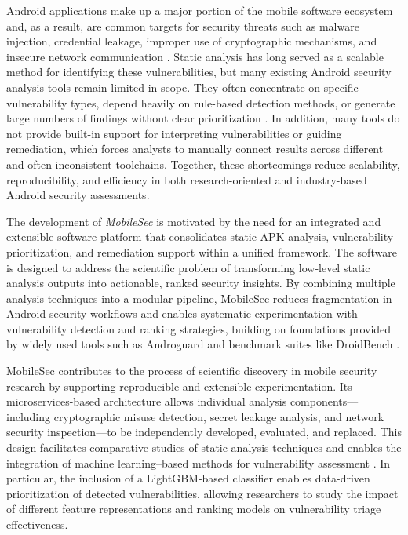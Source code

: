 \documentclass[preprint,12pt, a4paper]{elsarticle}
\begin{document}
Android applications make up a major portion of the mobile software ecosystem and, as a result, are common targets for security threats such as malware injection, credential leakage, improper use of cryptographic mechanisms, and insecure network communication \cite{arzt2014flowdroid, enck2014taintdroid}. Static analysis has long served as a scalable method for identifying these vulnerabilities, but many existing Android security analysis tools remain limited in scope. They often concentrate on specific vulnerability types, depend heavily on rule-based detection methods, or generate large numbers of findings without clear prioritization \cite{feng2014apposcopy, li2017iccta}. In addition, many tools do not provide built-in support for interpreting vulnerabilities or guiding remediation, which forces analysts to manually connect results across different and often inconsistent toolchains. Together, these shortcomings reduce scalability, reproducibility, and efficiency in both research-oriented and industry-based Android security assessments.

The development of \textit{MobileSec} is motivated by the need for an integrated and extensible software platform that consolidates static APK analysis, vulnerability prioritization, and remediation support within a unified framework. The software is designed to address the scientific problem of transforming low-level static analysis outputs into actionable, ranked security insights. By combining multiple analysis techniques into a modular pipeline, MobileSec reduces fragmentation in Android security workflows and enables systematic experimentation with vulnerability detection and ranking strategies, building on foundations provided by widely used tools such as Androguard \cite{desnos2011androguard} and benchmark suites like DroidBench \cite{arzt2014droidbench}.

MobileSec contributes to the process of scientific discovery in mobile security research by supporting reproducible and extensible experimentation. Its microservices-based architecture allows individual analysis components---including cryptographic misuse detection, secret leakage analysis, and network security inspection---to be independently developed, evaluated, and replaced. This design facilitates comparative studies of static analysis techniques and enables the integration of machine learning--based methods for vulnerability assessment \cite{liu2021mlsecurity}. In particular, the inclusion of a LightGBM-based classifier \cite{ke2017lightgbm} enables data-driven prioritization of detected vulnerabilities, allowing researchers to study the impact of different feature representations and ranking models on vulnerability triage effectiveness.
\end{document}
